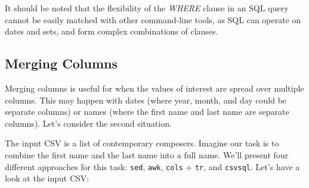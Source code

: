 \documentclass[
]{book}
\newenvironment{Shaded}{\begin{snugshade}}{\end{snugshade}}
\newcommand{\ExtensionTok}[1]{#1}
\newcommand{\FunctionTok}[1]{\textcolor[rgb]{0.00,0.00,0.00}{#1}}
\newcommand{\KeywordTok}[1]{\textcolor[rgb]{0.13,0.29,0.53}{\textbf{#1}}}
\newcommand{\NormalTok}[1]{#1}
\newcommand{\OperatorTok}[1]{\textcolor[rgb]{0.81,0.36,0.00}{\textbf{#1}}}
\theoremstyle{definition}
\theoremstyle{definition}
\theoremstyle{definition}
\theoremstyle{remark}
\begin{document}
It should be noted that the flexibility of the \emph{WHERE} clause in an SQL query cannot be easily matched with other command-line tools, as SQL can operate on dates and sets, and form complex combinations of clauses.

\hypertarget{merging-columns}{%
\subsection{Merging Columns}\label{merging-columns}}

Merging columns is useful for when the values of interest are spread over multiple columns. This may happen with dates (where year, month, and day could be separate columns) or names (where the first name and last name are separate columns). Let's consider the second situation.

The input CSV is a list of contemporary composers. Imagine our task is to combine the first name and the last name into a full name. We'll present four different approaches for this task: \texttt{sed}, \texttt{awk}, \texttt{cols} + \texttt{tr}, and \texttt{csvsql}. Let's have a look at the input CSV:

\begin{Shaded}
\end{Shaded}
\end{document}
